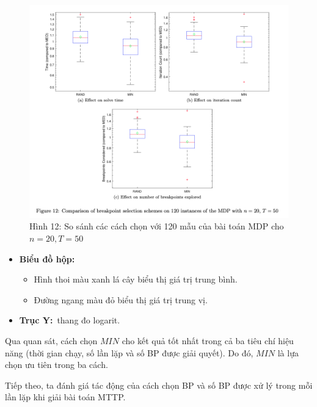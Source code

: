 \documentclass[../main.tex]{subfiles}
\begin{document}
\begin{figure}
\centering
\includegraphics{images/Figure12.png}
\caption{Hình 12: So sánh các cách chọn với 120 mẫu của bài toán MDP cho
\(n=20, T=50\)}
\end{figure}

\begin{itemize}
\tightlist
\item
  \textbf{Biểu đồ hộp:}

  \begin{itemize}
  \tightlist
  \item
    Hình thoi màu xanh lá cây biểu thị giá trị trung bình.
  \item
    Đường ngang màu đỏ biểu thị giá trị trung vị.
  \end{itemize}
\item
  \textbf{Trục Y:}~thang đo logarit.
\end{itemize}

Qua quan sát, cách chọn \(MIN\) cho kết quả tốt nhất trong cả ba tiêu
chí hiệu năng (thời gian chạy, số lần lặp và số BP được giải quyết). Do
đó, \(MIN\) là lựa chọn ưu tiên trong ba cách.

Tiếp theo, ta đánh giá tác động của cách chọn BP và số BP được xử lý
trong mỗi lần lặp khi giải bài toán MTTP.
\end{document}
